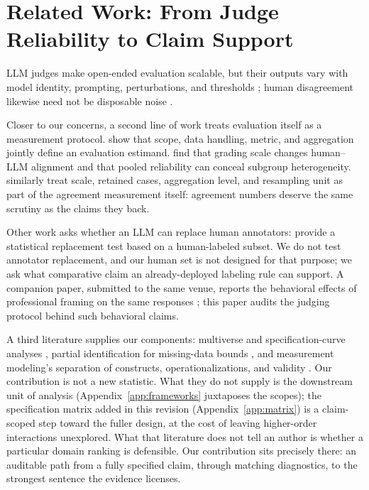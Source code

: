 \documentclass[11pt]{article}
\begin{document}
\section{Related Work: From Judge Reliability to Claim Support}
\label{sec:related}

LLM judges make open-ended evaluation scalable, but their outputs vary with model identity, prompting, perturbations, and thresholds \citep{zheng-2023-llmjudge,gu-2025-judgesurvey,alzahrani-2024-benchmarks,panickssery-2024-selfpreference}; human disagreement likewise need not be disposable noise \citep{aroyo-welty-2015,plank-2022-labelvariation,davani-2022-disagreements}.

Closer to our concerns, a second line of work treats evaluation itself as a measurement protocol. \citet{binette-reiter-2024-estimands} show that scope, data handling, metric, and aggregation jointly define an evaluation estimand. \citet{li-etal-2026-grading-scale} find that grading scale changes human--LLM alignment and that pooled reliability can conceal subgroup heterogeneity. \citet{rao-callisonburch-2026-agreement} similarly treat scale, retained cases, aggregation level, and resampling unit as part of the agreement measurement itself: agreement numbers deserve the same scrutiny as the claims they back.

Other work asks whether an LLM can replace human annotators: \citet{calderon-etal-2025-alttest} provide a statistical replacement test based on a human-labeled subset. We do not test annotator replacement, and our human set is not designed for that purpose; we ask what comparative claim an already-deployed labeling rule can support. A companion paper, submitted to the same venue, reports the behavioral effects of professional framing on the same responses \citep{anonymous-authority}; this paper audits the judging protocol behind such behavioral claims.

A third literature supplies our components: multiverse and specification-curve analyses \citep{steegen-2016-multiverse,simonsohn-2020-speccurve}, partial identification for missing-data bounds \citep{manski-1989-selection}, and measurement modeling's separation of constructs, operationalizations, and validity \citep{cronbach-meehl-1955,jacobs-wallach-2021-measurement}. Our contribution is not a new statistic. What they do not supply is the downstream unit of analysis (Appendix~\ref{app:frameworks} juxtaposes the scopes); the specification matrix added in this revision (Appendix~\ref{app:matrix}) is a claim-scoped step toward the fuller design, at the cost of leaving higher-order interactions unexplored. What that literature does not tell an author is whether a particular domain ranking is defensible. Our contribution sits precisely there: an auditable path from a fully specified claim, through matching diagnostics, to the strongest sentence the evidence licenses.
\end{document}

